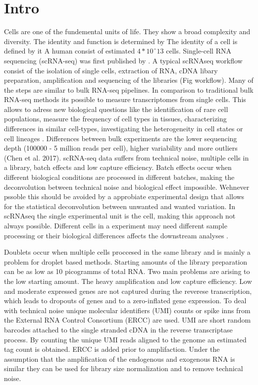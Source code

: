 \documentclass[11pt, a4paper]{article}\usepackage[]{graphicx}\usepackage[]{color}
\begin{document}
\tableofcontents
\bigskip

\section{Intro}
Cells are one of the fundemental units of life. They show a broad complexity and diversity. The identity and function is determined by The identity of a cell is defined by it A human consist of estimated $4*10ˆ13$ cells. 
Single-cell RNA sequencing (scRNA-seq) was first published by \citet{tang2009mrna}. A typical scRNAseq workflow consist of the isolation of single cells, extraction of RNA, cDNA libary preparation, amplification and  sequencing of the libraries (Fig workflow). Many of the steps are similar to bulk RNA-seq pipelines. In comparison to traditional bulk RNA-seq methods its possible to measure transcriptomes from single cells. This allows to adress new biological questions like the identification of rare cell populations, measure the frequency of cell types in tissues, characterizing differences in similar cell-types, investigating the heterogeneity in cell states or cell lineages \citet{andrews2017identifying}. 
Differences between bulk experiments are the lower sequencing depth (100000 - 5 million reads per cell), higher variability and more outliers (Chen et al. 2017).  
scRNA-seq data suffers from technical noise, multiple cells in a library, batch effects and low capture efficiency. 
Batch effects occur when different biological conditions are processed in different batches, making the deconvolution between technical noise and biological effect impossible. Wehnever pssoble this should be avoided by a approbiate experimental design that allows for the statistical deconvolution between unwanted and wanted variation. In scRNAseq the single experimental unit is the cell, making this approach not always possible. Different cells in a experiment may need different sample processing or their biological differences affects the downstream analyses \citep{wagner2016revealing}. 

Doublets occur when multiple cells proccesed in the same library and is mainly a problem for droplet based methods. Starting amounts of the library preparation can be as low as 10 picogramms of total RNA. Two main problems are arising to the low starting amount. The heavy amplification and low capture efficiency.
 Low and moderate expressed genes are not captured during the reverese transcription, which  leads to dropouts of genes and to a zero-inflated gene expression. 
 To deal with technical noise unique molecular identifiers (UMI) counts or spike inns from the External RNA Control Consortium  (ERCC) are used. UMI are short random barcodes attached to the single stranded cDNA in the reverse transcriptase process. By counting the unique UMI reads aligned to the genome an estimated tag count is obtained. ERCC is added prior to amplifaction. Under the assumption that the amplification of the endogenous and exogenous RNA is similar they can be used for library size normalization and to remove technical noise. 
\end{document}
